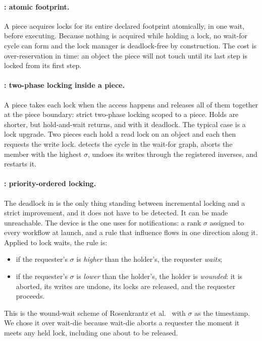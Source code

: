 \paragraph{\cc: atomic footprint.}
A piece acquires locks for its entire declared footprint atomically, in one
wait, before executing. Because nothing is acquired while holding a lock, no
wait-for cycle can form and the lock manager is deadlock-free by
construction. The cost is over-reservation in time: an object the piece will
not touch until its last step is locked from its first step.

\paragraph{\cctwo: two-phase locking inside a piece.}
A piece takes each lock when the access happens and releases all of them
together at the piece boundary: strict two-phase locking scoped to a piece.
Holds are shorter, but hold-and-wait returns, and with it deadlock. The
typical case is a lock upgrade. Two pieces each hold a read lock on an object
and each then requests the write lock. \cctwo detects the cycle in the
wait-for graph, aborts the member with the highest $\sigma$, undoes its writes
through the registered inverses, and restarts it.

\paragraph{\ccs: priority-ordered locking.}
The deadlock in \cctwo is the only thing standing between incremental locking
and a strict improvement, and it does not have to be detected. It can be made
unreachable. The device is the one \mtpo uses for notifications: a rank
$\sigma$ assigned to every workflow at launch, and a rule that influence flows
in one direction along it. Applied to lock waits, the rule is:
\begin{itemize}
\item if the requester's $\sigma$ is \emph{higher} than the holder's, the
  requester \emph{waits};
\item if the requester's $\sigma$ is \emph{lower} than the holder's, the
  holder is \emph{wounded}: it is aborted, its writes are undone, its locks
  are released, and the requester proceeds.
\end{itemize}
This is the wound-wait scheme of Rosenkrantz et al.~\cite{rosenkrantz1978}
with $\sigma$ as the timestamp. We chose it over wait-die because wait-die
aborts a requester the moment it meets any held lock, including one about to
be released.

